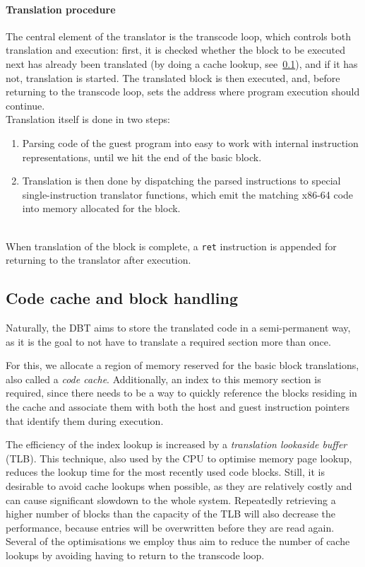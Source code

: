 \paragraph{Translation procedure} \mbox{}

\nopagebreak
The central element of the translator is the transcode loop, which controls both translation and execution:
first, it is checked whether the block to be executed next has already been translated (by doing a cache lookup, see~\ref{sec:code-cache}), and if it has not, translation is started.
The translated block is then executed, and, before returning to the transcode loop, sets the address where program execution should continue.\\
Translation itself is done in two steps:
\begin{enumerate}
	\item Parsing code of the guest program into easy to work with internal instruction representations, until we hit the end of the basic block.
	\item Translation is then done by dispatching the parsed instructions to special single-instruction translator functions, which emit the matching x86-64 code into memory allocated for the block.
\end{enumerate}\mbox{}\\
When translation of the block is complete, a \texttt{ret} instruction is appended for returning to the translator after execution.


\subsection{Code cache and block handling}
\label{sec:code-cache}
Naturally, the DBT aims to store the translated code in a semi-permanent way, as it is the goal to not have to translate a required section more than once.

For this, we allocate a region of memory reserved for the basic block translations, also called a \textit{code cache}.
Additionally, an index to this memory section is required, since there needs to be a way to quickly reference the blocks residing in the cache and associate them with both the host and guest instruction pointers that identify them during execution.

The efficiency of the index lookup is increased by a \textit{translation lookaside buffer} (TLB).
This technique, also used by the CPU to optimise memory page lookup, reduces the lookup time for the most recently used code blocks.
Still, it is desirable to avoid cache lookups when possible, as they are relatively costly and can cause significant slowdown to the whole system. 
Repeatedly retrieving a higher number of blocks than the capacity of the TLB will also decrease the performance, because entries will be overwritten before they are read again.
Several of the optimisations we employ thus aim to reduce the number of cache lookups by avoiding having to return to the transcode loop.

